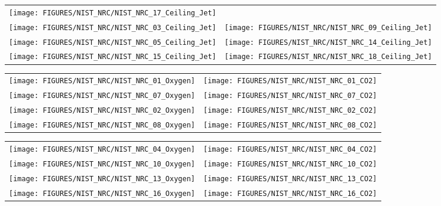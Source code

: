 \begin{figure}[p]
\begin{tabular*}{\textwidth}{l@{\extracolsep{\fill}}r}
\texttt{[image: FIGURES/NIST\_NRC/NIST\_NRC\_17\_Ceiling\_Jet]} &
 \\
\texttt{[image: FIGURES/NIST\_NRC/NIST\_NRC\_03\_Ceiling\_Jet]} &
\texttt{[image: FIGURES/NIST\_NRC/NIST\_NRC\_09\_Ceiling\_Jet]} \\
\texttt{[image: FIGURES/NIST\_NRC/NIST\_NRC\_05\_Ceiling\_Jet]} &
\texttt{[image: FIGURES/NIST\_NRC/NIST\_NRC\_14\_Ceiling\_Jet]} \\
\texttt{[image: FIGURES/NIST\_NRC/NIST\_NRC\_15\_Ceiling\_Jet]} &
\texttt{[image: FIGURES/NIST\_NRC/NIST\_NRC\_18\_Ceiling\_Jet]}
\end{tabular*}
\label{NIST_NRC_Jet_Open}
\end{figure}

\clearpage

\begin{figure}[p]
\begin{tabular*}{\textwidth}{l@{\extracolsep{\fill}}r}
\texttt{[image: FIGURES/NIST\_NRC/NIST\_NRC\_01\_Oxygen]} &
\texttt{[image: FIGURES/NIST\_NRC/NIST\_NRC\_01\_CO2]} \\
\texttt{[image: FIGURES/NIST\_NRC/NIST\_NRC\_07\_Oxygen]} &
\texttt{[image: FIGURES/NIST\_NRC/NIST\_NRC\_07\_CO2]} \\
\texttt{[image: FIGURES/NIST\_NRC/NIST\_NRC\_02\_Oxygen]} &
\texttt{[image: FIGURES/NIST\_NRC/NIST\_NRC\_02\_CO2]} \\
\texttt{[image: FIGURES/NIST\_NRC/NIST\_NRC\_08\_Oxygen]} &
\texttt{[image: FIGURES/NIST\_NRC/NIST\_NRC\_08\_CO2]}
\end{tabular*}
\end{figure}

\begin{figure}[p]
\begin{tabular*}{\textwidth}{l@{\extracolsep{\fill}}r}
\texttt{[image: FIGURES/NIST\_NRC/NIST\_NRC\_04\_Oxygen]} &
\texttt{[image: FIGURES/NIST\_NRC/NIST\_NRC\_04\_CO2]} \\
\texttt{[image: FIGURES/NIST\_NRC/NIST\_NRC\_10\_Oxygen]} &
\texttt{[image: FIGURES/NIST\_NRC/NIST\_NRC\_10\_CO2]} \\
\texttt{[image: FIGURES/NIST\_NRC/NIST\_NRC\_13\_Oxygen]} &
\texttt{[image: FIGURES/NIST\_NRC/NIST\_NRC\_13\_CO2]} \\
\texttt{[image: FIGURES/NIST\_NRC/NIST\_NRC\_16\_Oxygen]} &
\texttt{[image: FIGURES/NIST\_NRC/NIST\_NRC\_16\_CO2]}
\end{tabular*}\
\end{figure}

